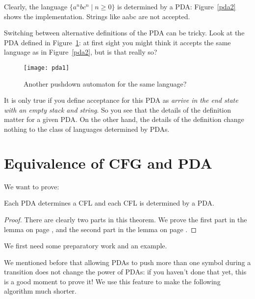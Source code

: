 Clearly, the language $\{a^nbc^n\mid n \geq 0\}$ is determined by a PDA:
Figure~\ref{pda2} shows the implementation. Strings like aabc are not
accepted.


Switching between alternative definitions of the PDA can be
tricky. Look at the PDA defined in Figure~\ref{pda1}: at first sight
you might think it accepts the same language as in Figure~\ref{pda2},
but is that really so?

\begin{figure}[h]
	\centering
	\texttt{[image: pda1]}
	\caption{Another pushdown automaton for the same language?\label{pda1}}
\end{figure}

It is only true if you define acceptance for this PDA as {\em arrive
  in the end state with an empty stack and string}. So you see that
the details of the definition matter for a given PDA. On the other
hand, the details of the definition change nothing to the class of
languages determined by PDAs.


\section{Equivalence of CFG and PDA}
We want to prove:
\begin{theorem}\label{pdaiscfl}
	Each PDA determines a CFL and each CFL is determined by a PDA.
\end{theorem}
\begin{proof}
There are clearly two parts in this theorem. We prove the first part
in the lemma on page \pageref{equicfgpda1}, and the second part in the lemma on page \pageref{equicfgpda2}.
\end{proof}
We first need some preparatory work and an example. 

We mentioned before that allowing PDAs to push more than one symbol
during a transition does not change the power of PDAs: if you haven't
done that yet, this is a good moment to prove it! We use this feature
to make the following algorithm much shorter.

